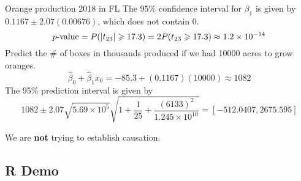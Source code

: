 \begin{Example}{Orange production 2018 in FL}{}
    The $ 95\% $ confidence interval for $ \beta_1 $ is given by
    $ 0.1167\pm 2.07(0.00676) $,
    which does not contain $ 0 $.
    \[ p\text{-value}=P(\lvert t_{23}\rvert\geqslant 17.3)=
        2P(t_{23}\geqslant 17.3)\approx 1.2\times 10^{-14} \]
    Predict the \# of boxes in thousands produced if we had
    10000 acres to grow oranges.
    \[ \hat{\beta}_0+\hat{\beta}_1x_0=-85.3+(0.1167)(10000)\approx 1082 \]
    The 95\% prediction interval is given by
    \[ 1082\pm 2.07\sqrt{5.69\times 10^5}\sqrt{1+\frac{1}{25}+
        \frac{(6133)^2}{1.245\times 10^{10}} }=
            [-512.0407, 2675.595] \]
    \begin{Remark}{}{}
        We are \textbf{not} trying to establish causation.
    \end{Remark}
\end{Example}
\subsection{R Demo}

